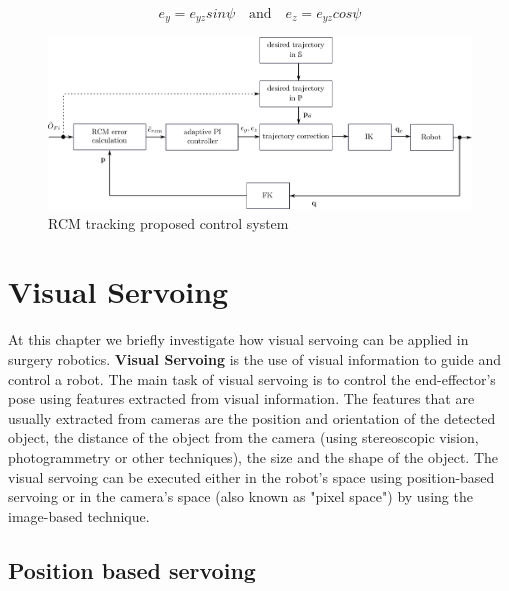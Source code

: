 \begin{equation}
e_y = e_{yz}sinψ \quad \textrm{and} \quad e_z = e_{yz}cosψ
\end{equation}

\begin{center}
\begin{figure}[!htb]
\centering
\includegraphics[width=\textwidth]{images/rcm-system-control.png}
\caption{RCM tracking proposed control system}
\end{figure}
\end{center}


\section{Visual Servoing}

At this chapter we briefly investigate how visual servoing can be applied in surgery robotics. \textbf{Visual Servoing} is the use of visual information 
to guide and control a robot. The main task of visual servoing is to control the end-effector's pose using features extracted from visual information. The 
features that are usually extracted from cameras are the position and orientation of the detected object, the distance of the object from the camera (using 
stereoscopic vision, photogrammetry or other techniques), the size and the shape of the object. The visual servoing can be executed either in the robot's space 
using position-based servoing or in the camera's space (also known as "pixel space") by using the image-based technique.

\subsection{Position based servoing}

